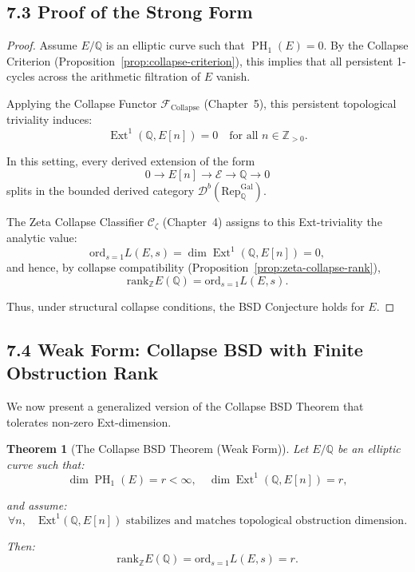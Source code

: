 \documentclass[11pt]{article}
\newtheorem{theorem}{Theorem}[section]
\DeclareMathOperator{\Ext}{Ext}
\DeclareMathOperator{\PH}{PH}
\begin{document}
\subsection{7.3 Proof of the Strong Form}

\begin{proof}
Assume $E/\mathbb{Q}$ is an elliptic curve such that $\PH_1(E) = 0$.  
By the Collapse Criterion (Proposition~\ref{prop:collapse-criterion}), this implies that all persistent 1-cycles across the arithmetic filtration of $E$ vanish.

Applying the Collapse Functor $\mathcal{F}_{\mathrm{Collapse}}$ (Chapter~5), this persistent topological triviality induces:
\[
\Ext^1(\mathbb{Q},E[n]) = 0 \quad \text{for all } n \in \mathbb{Z}_{>0}.
\]

In this setting, every derived extension of the form
\[
0 \to E[n] \to \mathcal{E} \to \mathbb{Q} \to 0
\]
splits in the bounded derived category $\mathcal{D}^b(\mathrm{Rep}_{\mathbb{Q}}^{\text{Gal}})$.

The Zeta Collapse Classifier $\mathcal{C}_\zeta$ (Chapter~4) assigns to this Ext-triviality the analytic value:
\[
\mathrm{ord}_{s=1} L(E,s) = \dim \Ext^1(\mathbb{Q},E[n]) = 0,
\]
and hence, by collapse compatibility (Proposition~\ref{prop:zeta-collapse-rank}),
\[
\mathrm{rank}_{\mathbb{Z}} E(\mathbb{Q}) = \mathrm{ord}_{s=1} L(E,s).
\]

Thus, under structural collapse conditions, the BSD Conjecture holds for $E$.
\end{proof}

\subsection{7.4 Weak Form: Collapse BSD with Finite Obstruction Rank}

We now present a generalized version of the Collapse BSD Theorem that tolerates non-zero Ext-dimension.

\begin{theorem}[The Collapse BSD Theorem (Weak Form)]
\label{thm:collapse-bsd-weak}
Let $E/\mathbb{Q}$ be an elliptic curve such that:
\[
\dim \PH_1(E) = r < \infty,
\quad \dim \Ext^1(\mathbb{Q},E[n]) = r,
\]

and assume:
\[
\forall n, \quad \mathrm{Ext}^1(\mathbb{Q},E[n]) \text{ stabilizes and matches topological obstruction dimension}.
\]

Then:
\[
\mathrm{rank}_{\mathbb{Z}} E(\mathbb{Q}) = \mathrm{ord}_{s=1} L(E,s) = r.
\]
\end{theorem}
\end{document}
